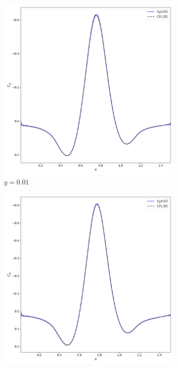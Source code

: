  \begin{figure}[ht!]
\centering
\begin{subfigure}{.45\textwidth}
  \centering
  \includegraphics[width=1.0\textwidth]{figs/3dbump/cop001.pdf}
  \caption{$y=0.01$}
\end{subfigure}%
\begin{subfigure}{.45\textwidth}
  \centering
  \includegraphics[width=1.0\textwidth]{figs/3dbump/cop015.pdf}

\end{subfigure}
\end{figure}

